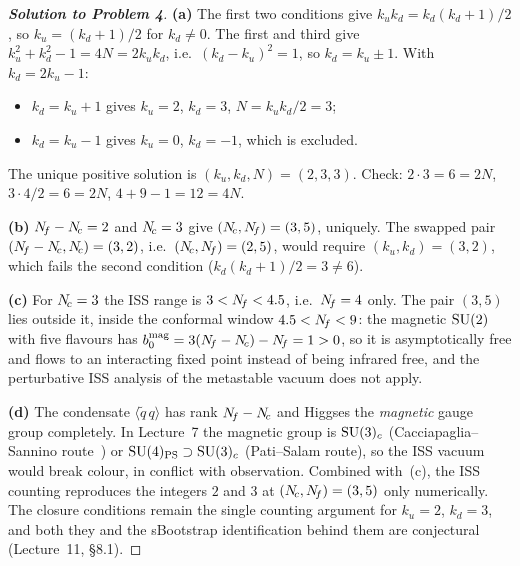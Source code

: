 \documentclass[11pt,a4paper]{article}
\begin{document}
\begin{proof}[\textbf{Solution to Problem 4}]

\textbf{(a)} The first two conditions give
$k_u k_d = k_d(k_d+1)/2$, so $k_u = (k_d+1)/2$ for $k_d \neq 0$.  The
first and third give $k_u^2 + k_d^2 - 1 = 4N = 2k_u k_d$, i.e.\
$(k_d-k_u)^2 = 1$, so $k_d = k_u \pm 1$.  With $k_d = 2k_u - 1$:
\begin{itemize}
  \item $k_d = k_u + 1$ gives $k_u = 2$, $k_d = 3$, $N = k_uk_d/2 = 3$;
  \item $k_d = k_u - 1$ gives $k_u = 0$, $k_d = -1$, which is excluded.
\end{itemize}
The unique positive solution is $(k_u,k_d,N) = (2,3,3)$.  Check:
$2\cdot3 = 6 = 2N$, $3\cdot4/2 = 6 = 2N$, $4+9-1 = 12 = 4N$.

\medskip

\textbf{(b)} $N_{\!f} - N_{\!c} = 2$ and $N_{\!c} = 3$ give $(N_{\!c},N_{\!f}) = (3,5)$,
uniquely.  The swapped pair $(N_{\!f}-N_{\!c},N_{\!c}) = (3,2)$, i.e.\
$(N_{\!c},N_{\!f}) = (2,5)$, would require $(k_u,k_d) = (3,2)$, which fails
the second condition ($k_d(k_d+1)/2 = 3 \neq 6$).

\medskip

\textbf{(c)} For $N_{\!c} = 3$ the ISS range is $3 < N_{\!f} < 4.5$, i.e.\
$N_{\!f} = 4$ only.  The pair $(3,5)$ lies outside it, inside the
conformal window $4.5 < N_{\!f} < 9$: the magnetic $\mathrm{SU}(2)$ with five
flavours has $b_0^{\text{mag}} = 3(N_{\!f}-N_{\!c}) - N_{\!f} = 1 > 0$, so it is
asymptotically free and flows to an interacting fixed point instead of
being infrared free, and the perturbative ISS analysis of the
metastable vacuum does not apply.

\medskip

\textbf{(d)} The condensate $\langle\widetilde q\,q\rangle$ has rank
$N_{\!f}-N_{\!c}$ and Higgses the \emph{magnetic} gauge group completely.  In
Lecture~7 the magnetic group is $\mathrm{SU}(3)_c$ (Cacciapaglia--Sannino
route~\cite{CacciapagliaSannino2024}) or $\mathrm{SU}(4)_{\text{PS}} \supset \mathrm{SU}(3)_c$ (Pati--Salam route), so
the ISS vacuum would break colour, in conflict with observation.
Combined with~(c), the ISS counting reproduces the integers $2$ and
$3$ at $(N_{\!c},N_{\!f}) = (3,5)$ only numerically.  The closure conditions
remain the single counting argument for $k_u = 2$, $k_d = 3$, and
both they and the sBootstrap identification behind them are
conjectural (Lecture~11, \S8.1).

\end{proof}


\bigskip
\end{document}
